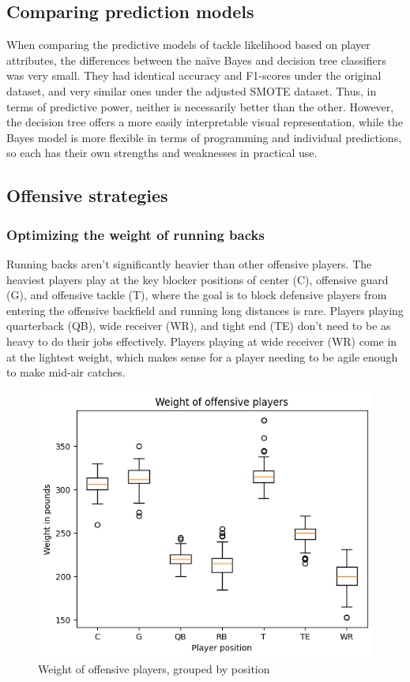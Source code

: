 \documentclass[bibtex, sigconf, hyperref={colorlinks=true,linkcolor=blue,urlcolor=blue}]{acmart}
\begin{document}
\subsection{Comparing prediction models}

When comparing the predictive models of tackle likelihood based on player
attributes, the differences between the na\"ive Bayes and decision tree
classifiers was very small. They had identical accuracy and F1-scores under the
original dataset, and very similar ones under the adjusted SMOTE dataset.
Thus, in terms of predictive power, neither is necessarily better than the
other. However, the decision tree offers a more easily interpretable visual
representation, while the Bayes model is more flexible in terms of programming
and individual predictions, so each has their own strengths and weaknesses in
practical use.

\subsection{Offensive strategies}

\subsubsection{Optimizing the weight of running backs}

Running backs aren't significantly heavier than other offensive players. The
heaviest players play at the key blocker positions of center (C), offensive
guard (G), and offensive tackle (T), where the goal is to block defensive
players from entering the offensive backfield and running long distances is
rare. Players playing quarterback (QB), wide receiver (WR), and tight end (TE)
don't need to be as heavy to do their jobs effectively. Players playing at wide
receiver (WR) come in at the lightest weight, which makes sense for a player
needing to be agile enough to make mid-air catches.

\begin{figure}[h]
  \centering
  \includegraphics[width=\linewidth]{weight-of-offensive-players.png}
  \caption{Weight of offensive players, grouped by position}
\end{figure}
\end{document}
